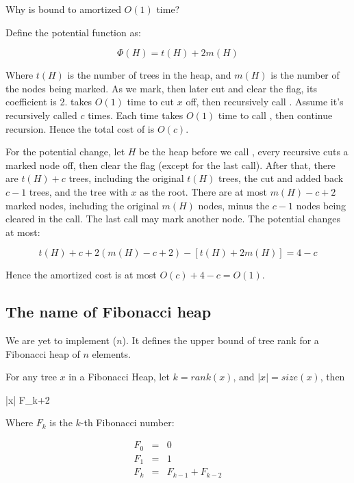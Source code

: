 \documentclass[b5paper]{article}
\begin{document}
\begin{Answer}[ref = {ex:fibo-heap-decrease}]
Why is  bound to amortized $O(1)$ time?

\vspace{3mm}
Define the potential function as:

\[
\Phi(H) = t(H) + 2m(H)
\]

Where $t(H)$ is the number of trees in the heap, and $m(H)$ is the number of the nodes being marked. As we mark, then later cut and clear the flag, its coefficient is 2.  takes $O(1)$ time to cut $x$ off, then recursively call . Assume it's recursively called $c$ times. Each time takes $O(1)$ time to call , then continue recursion. Hence the total cost of  is $O(c)$.

For the potential change, let $H$ be the heap before we call , every recursive  cuts a marked node off, then clear the flag (except for the last call). After that, there are $t(H) + c$ trees, including the original $t(H)$ trees, the cut and added back $c - 1$ trees, and the tree with $x$ as the root. There are at most $m(H) - c + 2$ marked nodes, including the original $m(H)$ nodes, minus the $c - 1$ nodes being cleared in the  call. The last call may mark another node. The potential changes at most:

\[
t(H) + c + 2(m(H) - c + 2) - [t(H) + 2m(H)] = 4 - c
\]

Hence the amortized cost is at most $O(c) + 4 - c = O(1)$.
\end{Answer}

\subsection{The name of Fibonacci heap}

We are yet to implement ($n$). It defines the upper bound of tree rank for a Fibonacci heap of $n$ elements.

\begin{lemma}
\label{lemma:Fib-degree}
For any tree $x$ in a Fibonacci Heap, let $k = rank(x)$, and $|x| = size(x)$, then

\be
  |x| \geq F_{k+2}
\ee

Where $F_k$ is the $k$-th Fibonacci number:

\[
\begin{array}{rcl}
F_0 & = & 0 \\
F_1 & = & 1 \\
F_k & = & F_{k-1} + F_{k-2} \\
\end{array}
\]
\end{lemma}
\end{document}
